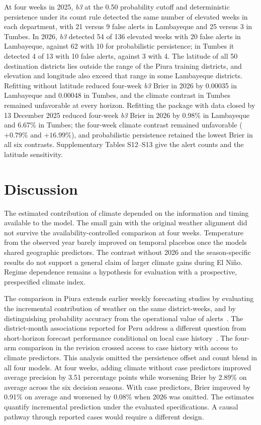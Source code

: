 \documentclass[journal]{IEEEtran}
\newcommand{\bthree}{\textit{b3}}
\begin{document}
At four weeks in 2025, \bthree{} at the 0.50 probability cutoff and deterministic persistence under its count rule detected the same number of elevated weeks in each department, with 21 versus 9 false alerts in Lambayeque and 25 versus 3 in Tumbes. In 2026, \bthree{} detected 54 of 136 elevated weeks with 20 false alerts in Lambayeque, against 62 with 10 for probabilistic persistence; in Tumbes it detected 4 of 13 with 10 false alerts, against 3 with 4. The latitude of all 50 destination districts lies outside the range of the Piura training districts, and elevation and longitude also exceed that range in some Lambayeque districts. Refitting without latitude reduced four-week \bthree{} Brier in 2026 by 0.00035 in Lambayeque and 0.00048 in Tumbes, and the climate contrast in Tumbes remained unfavorable at every horizon. Refitting the package with data closed by 13 December 2025 reduced four-week \bthree{} Brier in 2026 by 0.98\% in Lambayeque and 6.67\% in Tumbes; the four-week climate contrast remained unfavorable ($+0.79\%$ and $+16.99\%$), and probabilistic persistence retained the lowest Brier in all six contrasts. Supplementary Tables S12--S13 give the alert counts and the latitude sensitivity.

\section{Discussion}
The estimated contribution of climate depended on the information and timing available to the model. The small gain with the original weather alignment did not survive the availability-controlled comparison at four weeks. Temperature from the observed year barely improved on temporal placebos once the models shared geographic predictors. The contrast without 2026 and the season-specific results do not support a general claim of larger climate gains during El Ni\~no. Regime dependence remains a hypothesis for evaluation with a prospective, prespecified climate index.

The comparison in Piura extends earlier weekly forecasting studies by evaluating the incremental contribution of weather on the same district-weeks, and by distinguishing probability accuracy from the operational value of alerts~\cite{benedum2020,dasilva2025,chen2025}. The district-month associations reported for Peru address a different question from short-horizon forecast performance conditional on local case history~\cite{dostal2022}. The four-arm comparison in the revision crossed access to case history with access to climate predictors. This analysis omitted the persistence offset and count blend in all four models. At four weeks, adding climate without case predictors improved average precision by 3.51 percentage points while worsening Brier by 2.89\% on average across the six decision seasons. With case predictors, Brier improved by 0.91\% on average and worsened by 0.08\% when 2026 was omitted. The estimates quantify incremental prediction under the evaluated specifications. A causal pathway through reported cases would require a different design.
\end{document}

